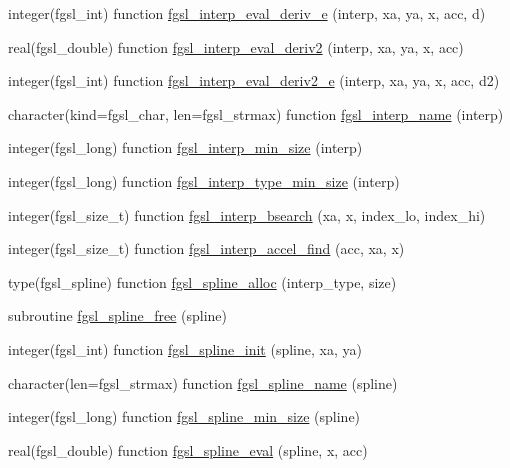 \begin{DoxyCompactItemize}
\item 
integer(fgsl\+\_\+int) function \hyperlink{interp_8finc_ab255bde1c108629a83829561e5f1b3db}{fgsl\+\_\+interp\+\_\+eval\+\_\+deriv\+\_\+e} (interp, xa, ya, x, acc, d)
\item 
real(fgsl\+\_\+double) function \hyperlink{interp_8finc_a4b15b2342368a4046e9d18f60131a9e7}{fgsl\+\_\+interp\+\_\+eval\+\_\+deriv2} (interp, xa, ya, x, acc)
\item 
integer(fgsl\+\_\+int) function \hyperlink{interp_8finc_a5752fd272762ec6357b0f8c353c6c1a5}{fgsl\+\_\+interp\+\_\+eval\+\_\+deriv2\+\_\+e} (interp, xa, ya, x, acc, d2)
\item 
character(kind=fgsl\+\_\+char, len=fgsl\+\_\+strmax) function \hyperlink{interp_8finc_a13eac3e860747823e4eb7056cdbaaadb}{fgsl\+\_\+interp\+\_\+name} (interp)
\item 
integer(fgsl\+\_\+long) function \hyperlink{interp_8finc_a573225f56abbabd3f942f378933e3f32}{fgsl\+\_\+interp\+\_\+min\+\_\+size} (interp)
\item 
integer(fgsl\+\_\+long) function \hyperlink{interp_8finc_abecb0b2e997eb9e0f0c71cc9f49ad981}{fgsl\+\_\+interp\+\_\+type\+\_\+min\+\_\+size} (interp)
\item 
integer(fgsl\+\_\+size\+\_\+t) function \hyperlink{interp_8finc_a3dfb39ce96909da1ffe68251b6faec82}{fgsl\+\_\+interp\+\_\+bsearch} (xa, x, index\+\_\+lo, index\+\_\+hi)
\item 
integer(fgsl\+\_\+size\+\_\+t) function \hyperlink{interp_8finc_ad43f0ec6e76ff3732ae85db85e6ed8fd}{fgsl\+\_\+interp\+\_\+accel\+\_\+find} (acc, xa, x)
\item 
type(fgsl\+\_\+spline) function \hyperlink{interp_8finc_a5a2b4ca82d49d34aff7cf04a9a1b12ab}{fgsl\+\_\+spline\+\_\+alloc} (interp\+\_\+type, size)
\item 
subroutine \hyperlink{interp_8finc_a0f868da0ef3261a833026a41f2c94c83}{fgsl\+\_\+spline\+\_\+free} (spline)
\item 
integer(fgsl\+\_\+int) function \hyperlink{interp_8finc_af11581be2da45017cdea99d9a5797d78}{fgsl\+\_\+spline\+\_\+init} (spline, xa, ya)
\item 
character(len=fgsl\+\_\+strmax) function \hyperlink{interp_8finc_a12c4a34e73aa03ba6dcdcdc6b270565d}{fgsl\+\_\+spline\+\_\+name} (spline)
\item 
integer(fgsl\+\_\+long) function \hyperlink{interp_8finc_a2a9de9f4376d87391948b2a36fd29f00}{fgsl\+\_\+spline\+\_\+min\+\_\+size} (spline)
\item 
real(fgsl\+\_\+double) function \hyperlink{interp_8finc_afd9bb964c160911f8fff6ada1478311e}{fgsl\+\_\+spline\+\_\+eval} (spline, x, acc)

\end{DoxyCompactItemize}
